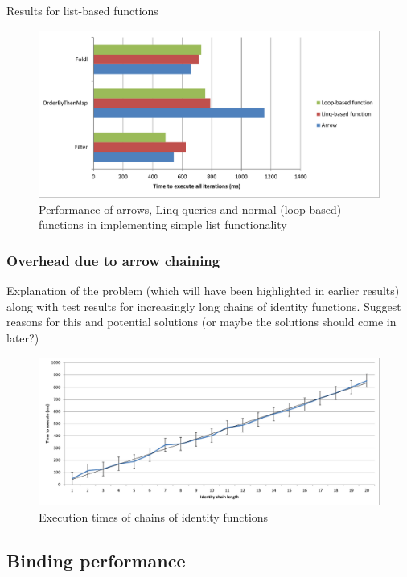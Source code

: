 \documentclass[12pt,twoside,notitlepage]{report}
\begin{document}
Results for list-based functions

\begin{figure}[!ht]
  \centering
  \includegraphics[width=\textwidth]{fig/ListFunctionPerformanceChart.pdf}
  \caption{Performance of arrows, Linq queries and normal (loop-based) functions in implementing simple list functionality}
  \label{fig:list_function_performance}
\end{figure}

\subsubsection{Overhead due to arrow chaining}
\label{sec:arrow_chaining_overhead}

Explanation of the problem (which will have been highlighted in earlier results) along with test results for increasingly long chains of identity functions. Suggest reasons for this and potential solutions (or maybe the solutions should come in later?)

\begin{figure}[!ht]
  \centering
  \includegraphics[width=\textwidth]{fig/IdentityChains.pdf}
  \caption{Execution times of chains of identity functions}
  \label{fig:arrow_chaining_overhead}
\end{figure}

\subsection{Binding performance}
\end{document}
